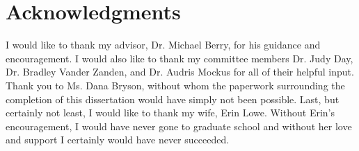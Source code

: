 \chapter*{Acknowledgments}
I would like to thank my advisor, Dr. Michael Berry, for his guidance
and encouragement.  I would also like to thank my committee members
Dr. Judy Day, Dr. Bradley Vander Zanden, and Dr. Audris Mockus for all
of their helpful input.  Thank you to Ms. Dana Bryson,
without whom the paperwork surrounding the completion of this
dissertation would have simply not been possible.  Last, but certainly
not least, I would like to thank my wife, Erin Lowe.  Without Erin's
encouragement, I would have never gone to graduate school and without
her love and support I certainly would have never succeeded.
